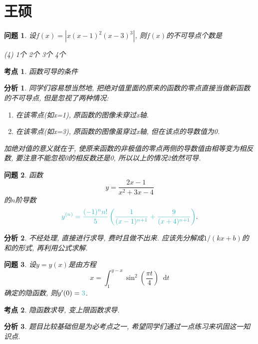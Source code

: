 \documentclass[a4paper, 12pt]{ctexart}
\theoremstyle{plain}
\newtheorem{problem}{问题}
\theoremstyle{nonumberplain}
\newtheorem{analysis}{分析}
\newtheorem{category}{考点}
\newcommand{\ans}[1]{\textcolor{Aquamarine}{#1}}
\newcommand*{\diff}{\mathop{}\!\mathrm{d}}
\newcommand{\lr}[3]{\left#1#3\right#2}
\begin{document}
\section{王硕}

\begin{problem}
    设$f(x)=\lr\vert\vert{x(x-1)^2(x-3)^3}$, 则$f(x)$的不可导点个数是
    \begin{tasks}(4)
        \task[\ans{(A)}] 1个
        \task 2个
        \task 3个
        \task 4个
    \end{tasks}
\end{problem}
\begin{category}
    函数可导的条件
\end{category}
\begin{analysis}
    同学们容易想当然地, 把绝对值里面的原来的函数的零点直接当做新函数的不可导点, 但是忽视了两种情况:
    \begin{enumerate}
        \item 在该零点(如x=1), 原函数的图像未穿过x轴.
        \item 在该零点(如x=3), 原函数的图像虽穿过x轴, 但在该点的导数值为0.
    \end{enumerate}
    加绝对值的意义就在于, 使原来函数的非极值的零点两侧的导数值由相等变为相反数, 要注意不能忽视0的相反数还是0, 所以以上的情况2依然可导.
\end{analysis}

\begin{problem}
    函数
    \begin{equation}
        y = \frac{2x-1}{x^2+3x-4}
    \end{equation}
    的$n$阶导数
    \begin{equation}
        \ans{y^{(n)} = \frac{(-1)^nn!}{5}\lr(){\frac{1}{(x-1)^{n+1}}+\frac{9}{(x+4)^{n+1}}}}.
    \end{equation}
\end{problem}
\begin{analysis}
    不经处理, 直接进行求导, 费时且做不出来. 应该先分解成$1/(kx+b)$的和的形式, 再利用公式求解.
\end{analysis}

\begin{problem}
    设$y=y(x)$是由方程
    \begin{equation}
        x = \int_1^{y-x}\sin^2(\frac{\pi t}{4})\diff t
    \end{equation}
    确定的隐函数, 则$y'(0)=\ans{3}$.
\end{problem}
\begin{category}
    隐函数求导, 变上限函数求导.
\end{category}
\begin{analysis}
    题目比较基础但是为必考点之一, 希望同学们通过一点练习来巩固这一知识点.
\end{analysis}
\end{document}
